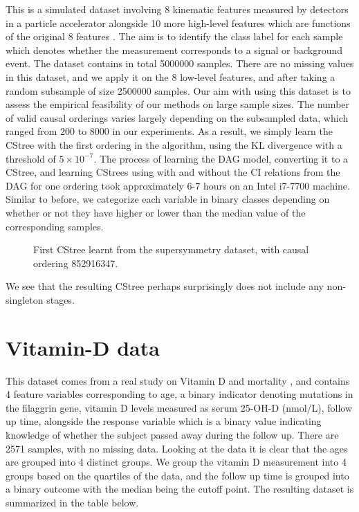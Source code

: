 \documentclass{tufte-book}
\begin{document}
This is a simulated dataset involving 8 kinematic features measured by detectors in a particle accelerator alongside 10 more high-level features which are functions of the original 8 features \cite{baldi-2014-searc-exotic}. The aim is to identify the class label for each sample which denotes whether the measurement corresponds to a signal or background event. The dataset contains in total 5000000 samples. There are no missing values in this dataset, and we apply it on the 8 low-level features, and after taking a random subsample of size 2500000 samples. Our aim with using this dataset is to assess the empirical feasibility of our methods on large sample sizes. The number of valid causal orderings varies largely depending on the subsampled data, which ranged from 200 to 8000 in our experiments. As a result, we simply learn the CStree with the first ordering in the algorithm,  using the KL divergence with a threshold of \(5\times 10^{-7}\). The process of learning the DAG model, converting it to a CStree, and learning CStrees using with and without the CI relations from the DAG for one ordering took approximately 6-7 hours on an Intel i7-7700 machine. Similar to before, we categorize each variable in binary classes depending on whether or not they have higher or lower than the median value of the corresponding samples. 

\begin{figure}[!h]\label{fig:susy1}
   \begin{floatrow}
%
\caption{First CStree learnt from the supersymmetry dataset, with causal ordering 852916347.}
        
   \end{floatrow}
\end{figure}

We see that the resulting CStree perhaps surprisingly does not include any non-singleton stages.


\section{Vitamin-D data}
\label{sec:org472e6cd}
This dataset comes from a real study on Vitamin D and mortality \cite{martinussen-2017-instr-variab}, and contains 4 feature variables corresponding to age, a binary indicator denoting mutations in the filaggrin gene, vitamin D levels measured  as serum 25-OH-D (nmol/L), follow up time, alongside the response variable which is a binary value indicating knowledge of whether the subject passed away during the follow up. There are 2571 samples, with no missing data. Looking at the data it is clear that the ages are grouped into 4 distinct groups. We group the vitamin D measurement into 4 groups based on the quartiles of the data, and the follow up time is grouped into a binary outcome with the median being the cutoff point. The resulting dataset is summarized in the table below.
\end{document}
